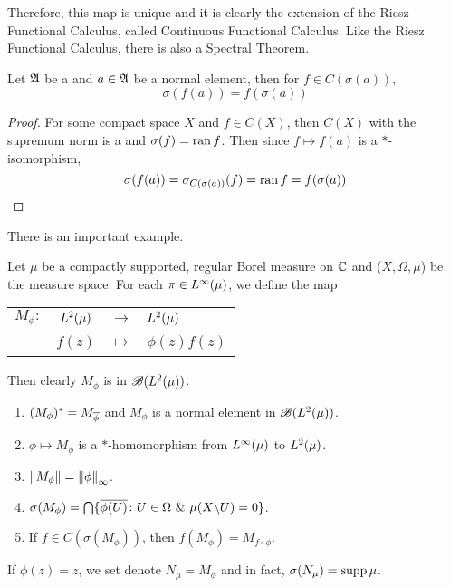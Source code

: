 \documentclass[a4paper,11pt]{report}
\begin{document}
Therefore, this map is unique and it is clearly the extension of the Riesz Functional Calculus, called Continuous Functional Calculus. Like the Riesz Functional Calculus, there is also a Spectral Theorem.
\begin{thm}
	Let $\mathfrak{A}$ be a \Cs and $a \in \mathfrak{A}$ be a normal element, then for $f \in C(\sigma(a))$, 
	\begin{equation*}
		\sigma(f(a)) = f(\sigma(a))
	\end{equation*}
\end{thm}
\begin{proof}
	For some compact space $X$ and $f \in C(X)$, then $C(X)$ with the supremum norm is a \Cs and $\sigma(f) = \operatorname{ran}{f}$. Then since $f \mapsto f(a)$ is a $*$-isomorphism, 
	\begin{equation*}
		\sigma(f(a)) = \sigma_{C(\sigma(a))}(f) = \operatorname{ran}{f} = f(\sigma(a)) \qedhere
	\end{equation*}
\end{proof}


There is an important example.
\begin{exam} \label{exam2}
	Let $\mu$ be a compactly supported, regular Borel measure on $\mathbb{C}$ and ($X,\Omega,\mu$) be the measure space. For each $\pi \in L^{\infty}(\mu)$, we define the map
	\begin{center}
		\begin{tabular}{l c c l}
			$M_{\phi} \colon$ & $L^{2}(\mu)$ & $\longrightarrow$ & $L^{2}(\mu)$ \\
			~ & $f(z)$ & $\longmapsto$ & $\phi(z)f(z)$
		\end{tabular} 
	\end{center}
	Then clearly $M_{\phi}$ is in $\mathscr{B}(L^{2}(\mu))$.
	\begin{enumerate}[label=\arabic*)]
		\item $(M_{\phi})^{*} = M_{\overline{\phi}}$ and $M_{\phi}$ is a normal element in $\mathscr{B}(L^{2}(\mu))$.
		\item $\phi \mapsto M_{\phi}$ is a $*$-homomorphism from $L^{\infty}(\mu)$ to $L^{2}(\mu)$.
		\item $\left\lVert M_{\phi}\right\lVert = \left\lVert\phi\right\lVert_{\infty}$.
		\item $\sigma(M_{\phi})= \bigcap\{\overline{\phi(U)} \colon U \in \Omega ~\&~ \mu(X \backslash U) = 0\}$.
		\item If $f \in C(\sigma(M_{\phi}))$, then $f(M_{\phi}) = M_{f \circ \phi}$.
	\end{enumerate}
	If $\phi(z) = z$, we set denote $N_{\mu} = M_{\phi}$ and in fact, $\sigma(N_{\mu}) = \operatorname{supp}{\mu}$.
\end{exam}
\end{document}
